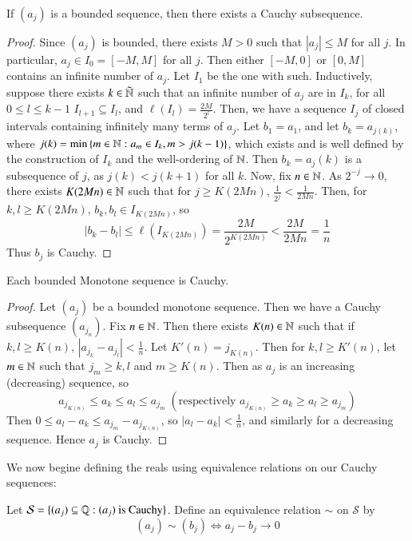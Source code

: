 \begin{proposition}
    If $(a_j)$ is a bounded sequence, then there exists a Cauchy subsequence.
\end{proposition}
\begin{proof}
    Since $(a_j)$ is bounded, there exists $M > 0$ such that $|a_j| \leq M$ for all $j$. In particular, $a_j \in I_0 = [-M,M]$ for all $j$. Then either $[-M,0]$ or $[0,M]$ contains an infinite number of $a_j$. Let $I_1$ be the one with such. Inductively, suppose there exists $k \in \tilde{\mathbb N}$ such that an infinite number of $a_j$ are in $I_k$, for all $0 \leq l \leq k-1$ $I_{l+1}\subseteq I_l$, and $\ell(I_l) = \frac{2M}{2^l}$. Then, we have a sequence $I_j$ of closed intervals containing infinitely many terms of $a_j$. Let $b_1 = a_1$, and let $b_k = a_{j(k)}$, where $j(k) = \min\left\{m \in \mathbb N: a_m \in I_k, m > j(k-1)\right\}$, which exists and is well defined by the construction of $I_k$ and the well-ordering of $\mathbb N$. Then $b_k = a_j(k)$ is a subsequence of $j$, as $j(k) < j(k+1)$ for all $k$. Now, fix $n \in \mathbb N$. As $2^{-j}\rightarrow 0$, there exists $K(2Mn) \in \mathbb N$ such that for $j \geq K(2Mn)$, $\frac{1}{2^j} < \frac{1}{2Mn}$. Then, for $k,l \geq K(2Mn)$, $b_k,b_l \in I_{K(2Mn)}$, so $$|b_k - b_l| \leq \ell(I_{K(2Mn)}) = \frac{2M}{2^{K(2Mn)}} < \frac{2M}{2Mn} = \frac{1}{n}$$ Thus $b_j$ is Cauchy.
\end{proof}

\begin{corollary}
    Each bounded Monotone sequence is Cauchy.
\end{corollary}
\begin{proof}
    Let $(a_j)$ be a bounded monotone sequence. Then we have a Cauchy subsequence $(a_{j_n})$. Fix $n \in \mathbb N$. Then there exists $K(n) \in \mathbb N$ such that if $k,l \geq K(n)$, $|a_{j_k} - a_{j_l}| < \frac{1}{n}$. Let $K'(n) = j_{K(n)}$. Then for $k,l \geq K'(n)$, let $m \in \mathbb N$ such that $j_m \geq k,l$ and $m \geq K(n)$. Then as $a_j$ is an increasing (decreasing) sequence, so $$a_{j_{K(n)}} \leq a_k \leq a_l \leq a_{j_m}\;(\text{respectively }a_{j_{K(n)}} \geq a_k \geq a_l \geq a_{j_m})$$ Then $0 \leq a_l - a_k \leq a_{j_m} - a_{j_{K(n)}}$, so $|a_l - a_k| < \frac{1}{n}$, and similarly for a decreasing sequence. Hence $a_j$ is Cauchy.
\end{proof}

We now begine defining the reals using equivalence relations on our Cauchy sequences:

\begin{definition}
    Let $\mathcal{S} = \{(a_j) \subseteq \mathbb Q:(a_j) \text{ is Cauchy}\}$. Define an equivalence relation $\sim$ on $\mathcal{S}$ by $$(a_j)\sim (b_j) \iff a_j-b_j\rightarrow 0$$
\end{definition}

